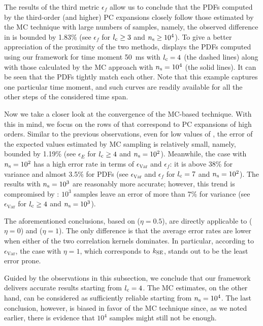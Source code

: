 The results of the third metric $\epsilon_f$ allow us to conclude that the PDFs
computed by the third-order (and higher) PC expansions closely follow those
estimated by the MC technique with large numbers of samples, namely, the
observed difference in  is bounded by 1.83\% (see
$\epsilon_f$ for ${l_\mathrm{c}} \geq 3$ and ${n_\mathrm{s}} \geq 10^4$). To give a better
appreciation of the proximity of the two methods,
 displays the PDFs computed using our framework
for time moment 50~ms with ${l_\mathrm{c}} = 4$ (the dashed lines) along with those
calculated by the MC approach with ${n_\mathrm{s}} = 10^4$ (the solid lines). It can be
seen that the PDFs tightly match each other. Note that this example captures one
particular time moment, and such curves are readily available for all the other
steps of the considered time span.

Now we take a closer look at the convergence of the MC-based technique. With
this in mind, we focus on the rows of  that correspond to
PC expansions of high orders. Similar to the previous observations, even for low
values of \ns, the error of the expected values estimated by MC sampling is
relatively small, namely, bounded by 1.19\% (see $\epsilon_E$ for ${l_\mathrm{c}} \geq 4$
and ${n_\mathrm{s}} = 10^2$). Meanwhile, the case with ${n_\mathrm{s}} = 10^2$ has a high error rate
in terms of $\epsilon_\mathrm{Var}$ and $\epsilon_f$: it is above 38\% for
variance and almost 3.5\% for PDFs (see $\epsilon_\mathrm{Var}$ and $\epsilon_f$
for ${l_\mathrm{c}} = 7$ and ${n_\mathrm{s}} = 10^2$). The results with ${n_\mathrm{s}} = 10^3$ are reasonably
more accurate; however, this trend is compromised by :
$10^3$ samples leave an error of more than 7\% for variance (see
$\epsilon_\mathrm{Var}$ for ${l_\mathrm{c}} \geq 4$ and ${n_\mathrm{s}} = 10^3$).

The aforementioned conclusions, based on  ($\eta = 0.5$),
are directly applicable to  ($\eta = 0$) and
 ($\eta = 1$). The only difference is that the average
error rates are lower when either of the two correlation kernels dominates. In
particular, according to $\epsilon_\mathrm{Var}$, the case with $\eta = 1$,
which corresponds to $k_{\mathrm{SE}}$, stands out to be the least error prone.

Guided by the observations in this subsection, we conclude that our framework
delivers accurate results starting from ${l_\mathrm{c}} = 4$. The MC estimates, on the
other hand, can be considered as sufficiently reliable starting from ${n_\mathrm{s}} =
10^4$. The last conclusion, however, is biased in favor of the MC technique
since, as we noted earlier, there is evidence that $10^4$ samples might still
not be enough.

